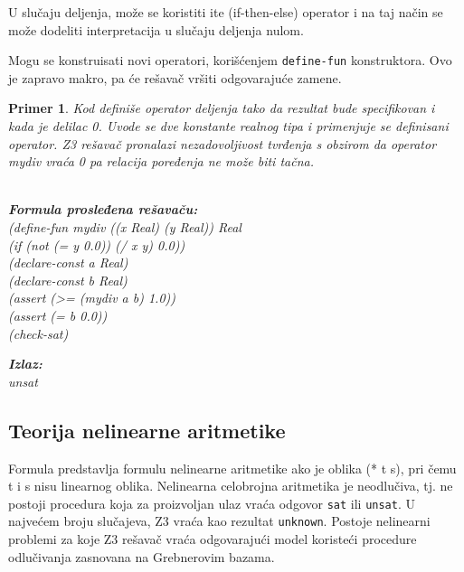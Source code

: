 \documentclass[12pt,oneside]{memoir}
\newcommand\tab[1][0.5cm]{\hspace*{#1}}
\newtheorem{primer}{Primer}
\begin{document}
U slučaju deljenja, može se koristiti ite (if-then-else) operator i na taj način se može dodeliti interpretacija u slučaju deljenja nulom.
\par
Mogu se konstruisati novi operatori, korišćenjem \texttt{define-fun} konstruktora. Ovo je zapravo makro, pa će rešavač vršiti odgovarajuće zamene.
\begin{primer} Kod definiše operator deljenja tako da rezultat bude specifikovan i kada je delilac 0. Uvode se dve konstante realnog tipa i primenjuje se definisani operator. Z3 rešavač pronalazi nezadovoljivost tvrđenja s obzirom da operator mydiv vraća 0 pa relacija poređenja ne može biti tačna.\\ \\
\begin{minipage}[b]{0.5\textwidth}
\textbf{Formula prosleđena rešavaču:}
\\(define-fun mydiv ((x Real) (y Real)) Real
\\\tab (if (not (= y 0.0))  (/ x y)  0.0))
\\(declare-const a Real)
\\(declare-const b Real)
\\(assert (>= (mydiv a b) 1.0))
\\(assert (= b 0.0))
\\(check-sat)
\end{minipage}
\hspace{3cm}
\begin{minipage}[t]{0.4\textwidth}
\vspace{-4.73cm}
\textbf{Izlaz:}
\\unsat
\end{minipage}
\end{primer}
\subsection{Teorija nelinearne aritmetike} 

Formula predstavlja formulu nelinearne aritmetike ako je oblika (* t s), pri čemu t i s nisu linearnog oblika.
Nelinearna celobrojna aritmetika je neodlučiva, tj. ne postoji procedura koja za proizvoljan ulaz vraća odgovor \texttt{sat} ili \texttt{unsat}. U najvećem broju slučajeva, Z3 vraća kao rezultat \texttt{unknown}. Postoje nelinearni problemi za koje Z3 rešavač vraća odgovarajući model koristeći procedure odlučivanja zasnovana na Grebnerovim bazama.
\end{document}
